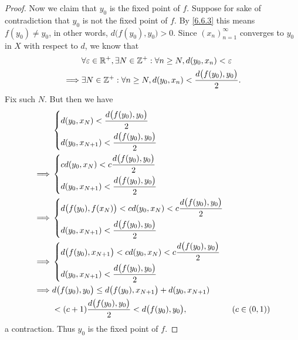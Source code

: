 \begin{proof}
  Now we claim that \(y_0\) is the fixed point of \(f\).
  Suppose for sake of contradiction that \(y_0\) is not the fixed point of \(f\).
  By \cref{6.6.3} this means \(f(y_0) \neq y_0\), in other words, \(d\big(f(y_0), y_0\big) > 0\).
  Since \((x_n)_{n = 1}^\infty\) converges to \(y_0\) in \(X\) with respect to \(d\), we know that
  \begin{align*}
             & \forall \varepsilon \in \mathbb{R}^+, \exists N \in \mathbb{Z}^+ : \forall n \geq N, d(y_0, x_n) < \varepsilon \\
    \implies & \exists N \in \mathbb{Z}^+ : \forall n \geq N, d(y_0, x_n) < \dfrac{d\big(f(y_0), y_0\big)}{2}.
  \end{align*}
  Fix such \(N\).
  But then we have
  \begin{align*}
             & \begin{dcases}
                 d(y_0, x_N) < \dfrac{d\big(f(y_0), y_0\big)}{2} \\
                 d(y_0, x_{N + 1}) < \dfrac{d\big(f(y_0), y_0\big)}{2}
               \end{dcases}                                                   \\
    \implies & \begin{dcases}
                 c d(y_0, x_N) < c \dfrac{d\big(f(y_0), y_0\big)}{2} \\
                 d(y_0, x_{N + 1}) < \dfrac{d\big(f(y_0), y_0\big)}{2}
               \end{dcases}                                                   \\
    \implies & \begin{dcases}
                 d\big(f(y_0), f(x_N)\big) < c d(y_0, x_N) < c \dfrac{d\big(f(y_0), y_0\big)}{2} \\
                 d(y_0, x_{N + 1}) < \dfrac{d\big(f(y_0), y_0\big)}{2}
               \end{dcases}                        \\
    \implies & \begin{dcases}
                 d\big(f(y_0), x_{N + 1}\big) < c d(y_0, x_N) < c \dfrac{d\big(f(y_0), y_0\big)}{2} \\
                 d(y_0, x_{N + 1}) < \dfrac{d\big(f(y_0), y_0\big)}{2}
               \end{dcases}                     \\
    \implies & d\big(f(y_0), y_0\big) \leq d\big(f(y_0), x_{N + 1}\big) + d(y_0, x_{N + 1})                           \\
             & < (c + 1) \dfrac{d\big(f(y_0), y_0\big)}{2} < d\big(f(y_0), y_0\big),                 & (c \in (0, 1))
  \end{align*}
  a contraction.
  Thus \(y_0\) is the fixed point of \(f\).
\end{proof}


